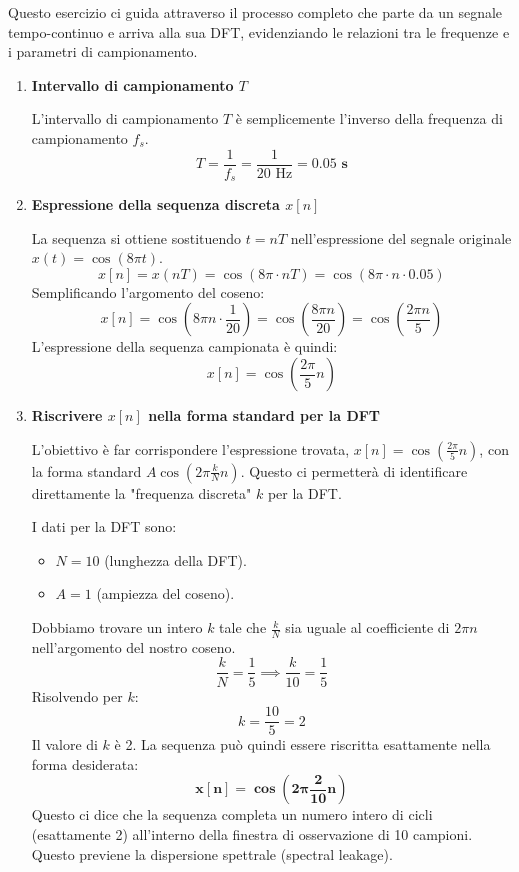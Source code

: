 
\begin{soluzione}{15}
    Questo esercizio ci guida attraverso il processo completo che parte da un segnale tempo-continuo e arriva alla sua DFT, evidenziando le relazioni tra le frequenze e i parametri di campionamento.

    \begin{enumerate}
        \item \textbf{Intervallo di campionamento $T$}
        
        L'intervallo di campionamento $T$ è semplicemente l'inverso della frequenza di campionamento $f_s$.
        \[
            T = \frac{1}{f_s} = \frac{1}{20 \text{ Hz}} = \mathbf{0.05 \text{ s}}
        \]
        
        \item \textbf{Espressione della sequenza discreta $x[n]$}
        
        La sequenza si ottiene sostituendo $t = nT$ nell'espressione del segnale originale $x(t) = \cos(8\pi t)$.
        \[
            x[n] = x(nT) = \cos(8\pi \cdot nT) = \cos(8\pi \cdot n \cdot 0.05)
        \]
        Semplificando l'argomento del coseno:
        \[
            x[n] = \cos(8\pi n \cdot \frac{1}{20}) = \cos\left(\frac{8\pi n}{20}\right) = \cos\left(\frac{2\pi n}{5}\right)
        \]
        L'espressione della sequenza campionata è quindi:
        \[
            x[n] = \cos\left(\frac{2\pi}{5}n\right)
        \]
        
        \item \textbf{Riscrivere $x[n]$ nella forma standard per la DFT}
        
        L'obiettivo è far corrispondere l'espressione trovata, $x[n] = \cos(\frac{2\pi}{5}n)$, con la forma standard $A \cos(2\pi \frac{k}{N}n)$. Questo ci permetterà di identificare direttamente la "frequenza discreta" $k$ per la DFT.
        
        I dati per la DFT sono:
        \begin{itemize}
            \item $N = 10$ (lunghezza della DFT).
            \item $A = 1$ (ampiezza del coseno).
        \end{itemize}
        Dobbiamo trovare un intero $k$ tale che $\frac{k}{N}$ sia uguale al coefficiente di $2\pi n$ nell'argomento del nostro coseno.
        \[
            \frac{k}{N} = \frac{1}{5} \implies \frac{k}{10} = \frac{1}{5}
        \]
        Risolvendo per $k$:
        \[
            k = \frac{10}{5} = 2
        \]
        Il valore di $k$ è 2. La sequenza può quindi essere riscritta esattamente nella forma desiderata:
        \[
            \mathbf{x[n] = \cos\left(2\pi \frac{2}{10}n\right)}
        \]
        Questo ci dice che la sequenza completa un numero intero di cicli (esattamente 2) all'interno della finestra di osservazione di 10 campioni. Questo previene la dispersione spettrale (spectral leakage).
        

\end{enumerate}
\end{soluzione}
